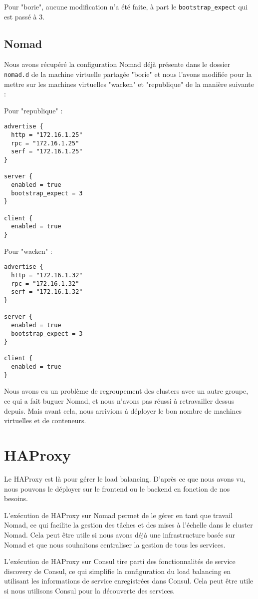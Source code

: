 \documentclass{report}
\begin{document}
Pour "borie", aucune modification n'a été faite, à part le \texttt{bootstrap\_expect} qui est passé à 3.

\section{Nomad}
Nous avons récupéré la configuration Nomad déjà présente dans le dossier \texttt{nomad.d} de la machine virtuelle partagée "borie" et nous l'avons modifiée pour la mettre sur les machines virtuelles "wacken" et "republique" de la manière suivante :

\newpage
Pour "republique" :
\begin{verbatim}
advertise {
  http = "172.16.1.25"
  rpc = "172.16.1.25"
  serf = "172.16.1.25"
}

server {
  enabled = true
  bootstrap_expect = 3
}

client {
  enabled = true
}
\end{verbatim}

Pour "wacken" :
\begin{verbatim}
advertise {
  http = "172.16.1.32"
  rpc = "172.16.1.32"
  serf = "172.16.1.32"
}

server {
  enabled = true
  bootstrap_expect = 3
}

client {
  enabled = true
}
\end{verbatim}

Nous avons eu un problème de regroupement des clusters avec un autre groupe, ce qui a fait buguer Nomad, et nous n'avons pas réussi à retravailler dessus depuis. Mais avant cela, nous arrivions à déployer le bon nombre de machines virtuelles et de conteneurs.

\newpage

\chapter{HAProxy}
Le HAProxy est là pour gérer le load balancing. D'après ce que nous avons vu, nous pouvons le déployer sur le frontend ou le backend en fonction de nos besoins.

L'exécution de HAProxy sur Nomad permet de le gérer en tant que travail Nomad, ce qui facilite la gestion des tâches et des mises à l'échelle dans le cluster Nomad. Cela peut être utile si nous avons déjà une infrastructure basée sur Nomad et que nous souhaitons centraliser la gestion de tous les services.

L'exécution de HAProxy sur Consul tire parti des fonctionnalités de service discovery de Consul, ce qui simplifie la configuration du load balancing en utilisant les informations de service enregistrées dans Consul. Cela peut être utile si nous utilisons Consul pour la découverte des services.
\end{document}

